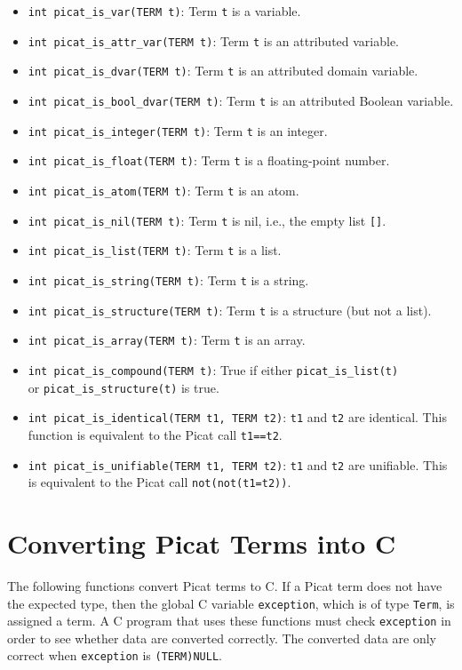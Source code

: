 \begin{itemize}
\item \texttt{int picat\_is\_var(TERM t)}: Term \texttt{t} is a variable.   
\item \texttt{int picat\_is\_attr\_var(TERM t)}: Term \texttt{t} is an attributed variable.   
\item \texttt{int picat\_is\_dvar(TERM t)}: Term \texttt{t} is an attributed domain variable.   
\item \texttt{int picat\_is\_bool\_dvar(TERM t)}: Term \texttt{t} is an attributed Boolean variable.   
\item \texttt{int picat\_is\_integer(TERM t)}: Term \texttt{t} is an integer.   
\item \texttt{int picat\_is\_float(TERM t)}: Term \texttt{t} is a floating-point number.   
\item \texttt{int picat\_is\_atom(TERM t)}: Term \texttt{t} is an atom.   
\item \texttt{int picat\_is\_nil(TERM t)}: Term \texttt{t} is nil, i.e., the empty list \texttt{[]}.   
\item \texttt{int picat\_is\_list(TERM t)}: Term \texttt{t} is a list.   
\item \texttt{int picat\_is\_string(TERM t)}: Term \texttt{t} is a string.
\item \texttt{int picat\_is\_structure(TERM t)}: Term \texttt{t} is a structure (but not a list).   
\item \texttt{int picat\_is\_array(TERM t)}: Term \texttt{t} is an array.   
\item \texttt{int picat\_is\_compound(TERM t)}: True if either \texttt{picat\_is\_list(t)} \\ or \texttt{picat\_is\_structure(t)} is true.   
\item \texttt{int picat\_is\_identical(TERM t1, TERM t2)}: \texttt{t1} and \texttt{t2} are identical. This function is equivalent to the Picat call \texttt{t1==t2}.
\item \texttt{int picat\_is\_unifiable(TERM t1, TERM t2)}: \texttt{t1} and \texttt{t2} are unifiable. This is equivalent to the Picat call \texttt{not(not(t1=t2))}.
\end{itemize}

\section{Converting Picat Terms into C}
The following functions convert Picat terms to C. If a Picat term does not have the expected type, then the global C variable \texttt{exception}, which is of type \texttt{Term}, is assigned a term. A C program that uses these functions must check \texttt{exception} in order to see whether data are converted correctly. The converted data are only correct when \texttt{exception} is \texttt{(TERM)NULL}.


